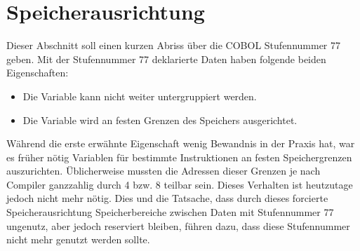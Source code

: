 \section{Speicherausrichtung}
Dieser Abschnitt soll einen kurzen Abriss über die COBOL Stufennummer 77 geben. Mit der Stufennummer 77 deklarierte Daten haben folgende beiden Eigenschaften:

\begin{itemize}
    \item Die Variable kann nicht weiter untergruppiert werden.
    \item Die Variable wird an festen Grenzen des Speichers ausgerichtet.
\end{itemize}

Während die erste erwähnte Eigenschaft wenig Bewandnis in der Praxis hat, war es früher nötig Variablen für bestimmte Instruktionen an festen Speichergrenzen auszurichten. Üblicherweise mussten die Adressen dieser Grenzen je nach Compiler ganzzahlig durch 4 bzw. 8 teilbar sein. Dieses Verhalten ist heutzutage jedoch nicht mehr nötig. Dies und die Tatsache, dass durch dieses forcierte Speicherausrichtung Speicherbereiche zwischen Daten mit Stufennummer 77 ungenutz, aber jedoch reserviert bleiben, führen dazu, dass diese Stufennummer nicht mehr genutzt werden sollte.